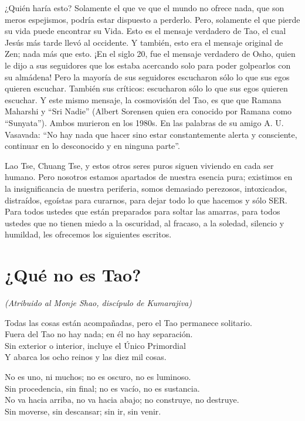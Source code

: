 \documentclass[hidelinks]{memoir}
\begin{document}
	¿Quién haría esto? Solamente el que ve que el mundo no ofrece nada, que
	son meros espejismos, podría estar dispuesto a perderlo. Pero, solamente
	el que pierde su vida puede encontrar su Vida. Esto es el mensaje
	verdadero de Tao, el cual Jesús más tarde llevó al occidente. Y también,
	esto era el mensaje original de Zen; nada más que esto. ¡En el siglo 20,
	fue el mensaje verdadero de Osho, quien le dijo a sus seguidores que los
	estaba acercando solo para poder golpearlos con su almádena! Pero la
	mayoría de sus seguidores escucharon sólo lo que sus egos quieren
	escuchar. También sus críticos: escucharon sólo lo que sus egos quieren
	escuchar. Y este mismo mensaje, la cosmovisión del Tao, es que que
	Ramana Maharshi y ``Sri Nadie'' (Albert Sorensen quien era conocido por
	Ramana como ``Sunyata''). Ambos murieron en los 1980s. En las palabras
	de su amigo A. U. Vasavada: ``No hay nada que hacer sino estar
	constantemente alerta y consciente, continuar en lo desconocido y en
	ninguna parte''.
	
	Lao Tse, Chuang Tse, y estos otros seres puros siguen viviendo en cada
	ser humano. Pero nosotros estamos apartados de nuestra esencia pura;
	existimos en la insignificancia de nuestra periferia, somos demasiado
	perezosos, intoxicados, distraídos, egoístas para curarnos, para dejar
	todo lo que hacemos y sólo SER. Para todos ustedes que están preparados
	para soltar las amarras, para todos ustedes que no tienen miedo a la
	oscuridad, al fracaso, a la soledad, silencio y humildad, les ofrecemos
	los siguientes escritos.
	
	\chapter*{¿Qué no es Tao?}


\textit{(Atribuido al Monje Shao, discípulo de Kumarajiva)}

\vspace{+1\baselineskip}
	
	Todas las cosas están acompañadas, pero el Tao permanece solitario.\\
	Fuera del Tao no hay nada; en él no hay separación.\\
	Sin exterior o interior, incluye el Único Primordial\\
	Y abarca los ocho reinos y las diez mil cosas.
	
	No es uno, ni muchos; no es oscuro, no es luminoso.\\
	Sin procedencia, sin final; no es vacío, no es sustancia.\\
	No va hacia arriba, no va hacia abajo; no construye, no destruye.\\
	Sin moverse, sin descansar; sin ir, sin venir.
	
\end{document}
